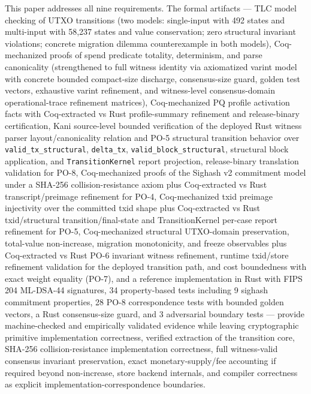 \documentclass[11pt]{article}
\begin{document}
This paper addresses all nine requirements.
The formal artifacts --- TLC model checking of UTXO transitions (two models: single-input with 492 states and multi-input with 58{,}237 states and value conservation; zero structural invariant violations; concrete migration dilemma counterexample in both models), Coq-mechanized proofs of spend predicate totality, determinism, and parse canonicality (strengthened to full witness identity via axiomatized varint model with concrete bounded compact-size discharge, consensus-size guard, golden test vectors, exhaustive varint refinement, and witness-level consensus-domain operational-trace refinement matrices), Coq-mechanized PQ profile activation facts with Coq-extracted vs Rust profile-summary refinement and release-binary certification, Kani source-level bounded verification of the deployed Rust witness parser layout/canonicality relation and PO-5 structural transition behavior over \texttt{valid\_tx\_structural}, \texttt{delta\_tx}, \texttt{valid\_block\_structural}, structural block application, and \texttt{TransitionKernel} report projection, release-binary translation validation for PO-8, Coq-mechanized proofs of the Sighash v2 commitment model under a SHA-256 collision-resistance axiom plus Coq-extracted vs Rust transcript/preimage refinement for PO-4, Coq-mechanized txid preimage injectivity over the committed txid shape plus Coq-extracted vs Rust txid/structural transition/final-state and TransitionKernel per-case report refinement for PO-5, Coq-mechanized structural UTXO-domain preservation, total-value non-increase, migration monotonicity, and freeze observables plus Coq-extracted vs Rust PO-6 invariant witness refinement, runtime txid/store refinement validation for the deployed transition path, and cost boundedness with exact weight equality (PO-7), and a reference implementation in Rust with FIPS\,204 ML-DSA-44 signatures, 34 property-based tests including 9 sighash commitment properties, 28 PO-8 correspondence tests with bounded golden vectors, a Rust consensus-size guard, and 3 adversarial boundary tests --- provide machine-checked and empirically validated evidence while leaving cryptographic primitive implementation correctness, verified extraction of the transition core, SHA-256 collision-resistance implementation correctness, full witness-valid consensus invariant preservation, exact monetary-supply/fee accounting if required beyond non-increase, store backend internals, and compiler correctness as explicit implementation-correspondence boundaries.



\end{document}
